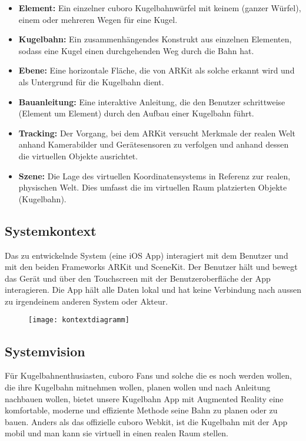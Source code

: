 \begin{itemize}
	\item \textbf{Element:} Ein einzelner cuboro Kugelbahnwürfel mit keinem (ganzer Würfel), einem oder mehreren Wegen für eine Kugel.
	\item \textbf{Kugelbahn:} Ein zusammenhängendes Konstrukt aus einzelnen Elementen, sodass eine Kugel einen durchgehenden Weg durch die Bahn hat.
	\item \textbf{Ebene:} Eine horizontale Fläche, die von ARKit als solche erkannt wird und als Untergrund für die Kugelbahn dient.
	\item \textbf{Bauanleitung:} Eine interaktive Anleitung, die den Benutzer schrittweise (Element um Element) durch den Aufbau einer Kugelbahn führt.
  \item \textbf{Tracking:} Der Vorgang, bei dem ARKit versucht Merkmale der realen Welt anhand Kamerabilder und Gerätesensoren zu verfolgen und anhand dessen die virtuellen Objekte ausrichtet.
  \item \textbf{Szene:} Die Lage des virtuellen Koordinatensystems in Referenz zur realen, physischen Welt. Dies umfasst die im virtuellen Raum platzierten Objekte (Kugelbahn).
\end{itemize}

\subsection{Systemkontext}

Das zu entwickelnde System (eine iOS App) interagiert mit dem Benutzer und mit den beiden Frameworks ARKit und SceneKit. Der Benutzer hält und bewegt das Gerät und über den Touchscreen mit der Benutzeroberfläche der App interagieren. Die App hält alle Daten lokal und hat keine Verbindung nach aussen zu irgendeinem anderen System oder Akteur.

\begin{figure}
  \texttt{[image: kontextdiagramm]}
\end{figure}

\subsection{Systemvision}

Für Kugelbahnenthusiasten, cuboro Fans und solche die es noch werden wollen,
die ihre Kugelbahn mitnehmen wollen, planen wollen und nach Anleitung nachbauen wollen,
bietet unsere Kugelbahn App
mit Augmented Reality
eine komfortable, moderne und effiziente Methode seine Bahn zu planen oder zu bauen.
Anders als das offizielle cuboro Webkit,
ist die Kugelbahn mit der App mobil und man kann sie virtuell in einen realen Raum stellen.

